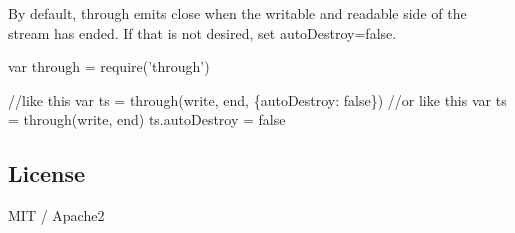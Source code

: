 By default, {\ttfamily through} emits close when the writable and readable side of the stream has ended. If that is not desired, set {\ttfamily auto\+Destroy=false}.


\begin{DoxyCode}
var through = require('through')

//like this
var ts = through(write, end, \{autoDestroy: false\})
//or like this
var ts = through(write, end)
ts.autoDestroy = false
\end{DoxyCode}


\subsection*{License}

M\+IT / Apache2 